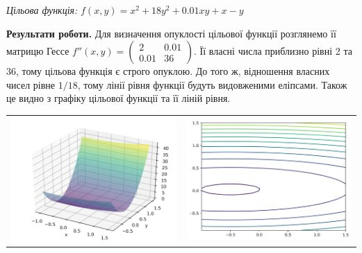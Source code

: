 \documentclass{extreport}
\begin{document}
\emph{Цільова функція:}
$f(x,y) = x^2 + 18y^2 + 0.01xy + x - y$

\noindent\textbf{Результати роботи.}
Для визначення опуклості цільової функції розглянемо її матрицю Гессе
$f''(x,y) = \begin{pmatrix}
    2 & 0.01 \\
    0.01 & 36
\end{pmatrix}$. Її власні числа приблизно рівні 2 та 36, 
тому цільова функція є строго опуклою. До того ж,
відношення власних чисел рівне $1/18$, тому лінії рівня
функції будуть видовженими еліпсами.
Також це видно з графіку цільової функції та її ліній рівня.
\begin{center}
    \begin{tabular}{c c}
        \includegraphics[scale = 0.6]{surface_init.png} &
        \includegraphics[scale = 0.5]{contour_init.png}
    \end{tabular}
\end{center}
\end{document}
